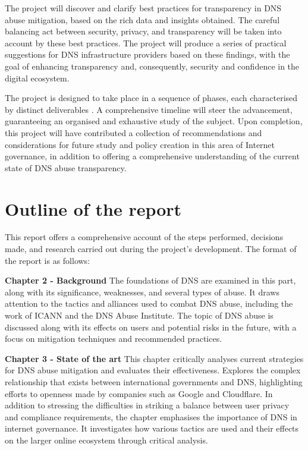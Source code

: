 The project will discover and clarify best practices for transparency in DNS abuse mitigation, based on the rich data and insights obtained. The careful balancing act between security, privacy, and transparency will be taken into account by these best practices. The project will produce a series of practical suggestions for DNS infrastructure providers based on these findings, with the goal of enhancing transparency and, consequently, security and confidence in the digital ecosystem.

The project is designed to take place in a sequence of phases, each characterised by distinct deliverables . A comprehensive timeline will steer the advancement, guaranteeing an organised and exhaustive study of the subject. Upon completion, this project will have contributed a collection of recommendations and considerations for future study and policy creation in this area of Internet governance, in addition to offering a comprehensive understanding of the current state of DNS abuse transparency.

\section{Outline of the report}

This report offers a comprehensive account of the steps performed, decisions made, and research carried out during the project's development. The format of the report is as follows:

\textbf{Chapter 2 - Background }
The foundations of DNS are examined in this part, along with its significance, weaknesses, and several types of abuse. It draws attention to the tactics and alliances used to combat DNS abuse, including the work of ICANN and the DNS Abuse Institute. The topic of DNS abuse is discussed along with its effects on users and potential risks in the future, with a focus on mitigation techniques and recommended practices.

\textbf{Chapter 3 -  State of the art }
This chapter critically analyses current strategies for DNS abuse mitigation and evaluates their effectiveness. Explores the complex relationship that exists between international governments and DNS, highlighting efforts to openness made by companies such as Google and Cloudflare. In addition to stressing the difficulties in striking a balance between user privacy and compliance requirements, the chapter emphasises the importance of DNS in internet governance. It investigates how various tactics are used and their effects on the larger online ecosystem through critical analysis.

